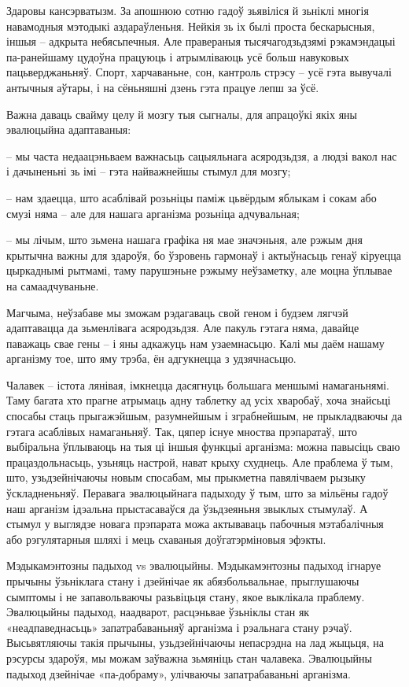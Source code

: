 Здаровы кансэрватызм. За апошнюю сотню гадоў зьявіліся й зьніклі многія навамодныя мэтодыкі аздараўленьня. Нейкія зь іх былі проста бескарысныя, іншыя – адкрыта небясьпечныя. Але правераныя тысячагодзьдзямі рэкамэндацыі па-ранейшаму цудоўна працуюць і атрымліваюць усё больш навуковых пацьверджаньняў. Спорт, харчаваньне, сон, кантроль стрэсу – усё гэта вывучалі антычныя аўтары, і на сёньняшні дзень гэта працуе лепш за ўсё.

Важна даваць свайму целу й мозгу тыя сыгналы, для апрацоўкі якіх яны эвалюцыйна адаптаваныя: 

– мы часта недаацэньваем важнасьць сацыяльнага асяродзьдзя, а людзі вакол нас і дачыненьні зь імі – гэта найважнейшы стымул для мозгу;

– нам здаецца, што асаблівай розьніцы паміж цьвёрдым яблыкам і сокам або смузі няма – але для нашага арганізма розьніца адчувальная;

– мы лічым, што зьмена нашага графіка ня мае значэньня, але рэжым дня крытычна важны для здароўя, бо ўзровень гармонаў і актыўнасьць генаў кіруецца цыркаднымі рытмамі, таму парушэньне рэжыму неўзаметку, але моцна ўплывае на самаадчуваньне.

Магчыма, неўзабаве мы зможам рэдагаваць свой геном і будзем лягчэй адаптавацца да зьменлівага асяродзьдзя. Але пакуль гэтага няма, давайце паважаць свае гены – і яны адкажуць нам узаемнасьцю. Калі мы даём нашаму арганізму тое, што яму трэба, ён адгукнецца з удзячнасьцю.

Чалавек – істота лянівая, імкнецца дасягнуць большага меншымі намаганьнямі. Таму багата хто прагне атрымаць адну таблетку ад усіх хваробаў, хоча знайсьці спосабы стаць прыгажэйшым, разумнейшым і зграбнейшым, не прыкладваючы да гэтага асаблівых намаганьняў. Так, цяпер існуе мноства прэпаратаў, што выбіральна ўплываюць на тыя ці іншыя функцыі арганізма: можна павысіць сваю працаздольнасьць, узьняць настрой, нават крыху схуднець. Але праблема ў тым, што, узьдзейнічаючы новым спосабам, мы прыкметна павялічваем рызыку ўскладненьняў. Перавага эвалюцыйнага падыходу ў тым, што за мільёны гадоў наш арганізм ідэальна прыстасаваўся да ўзьдзеяньня звыклых стымулаў. А стымул у выглядзе новага прэпарата можа актываваць пабочныя мэтабалічныя або рэгулятарныя шляхі і мець схаваныя доўгатэрміновыя эфэкты.

Мэдыкамэнтозны падыход vs эвалюцыйны. Мэдыкамэнтозны падыход ігнаруе прычыны ўзьніклага стану і дзейнічае як абязбольвальнае, прыглушаючы сымптомы і не запавольваючы разьвіцьця стану, якое выклікала праблему. Эвалюцыйны падыход, наадварот, расцэньвае ўзьніклы стан як «неадпаведнасьць» запатрабаваньняў арганізма і рэальнага стану рэчаў. Высьвятляючы такія прычыны, узьдзейнічаючы непасрэдна на лад жыцьця, на рэсурсы здароўя, мы можам заўважна зьмяніць стан чалавека. Эвалюцыйны падыход дзейнічае «па-добраму», улічваючы запатрабаваньні арганізма.

